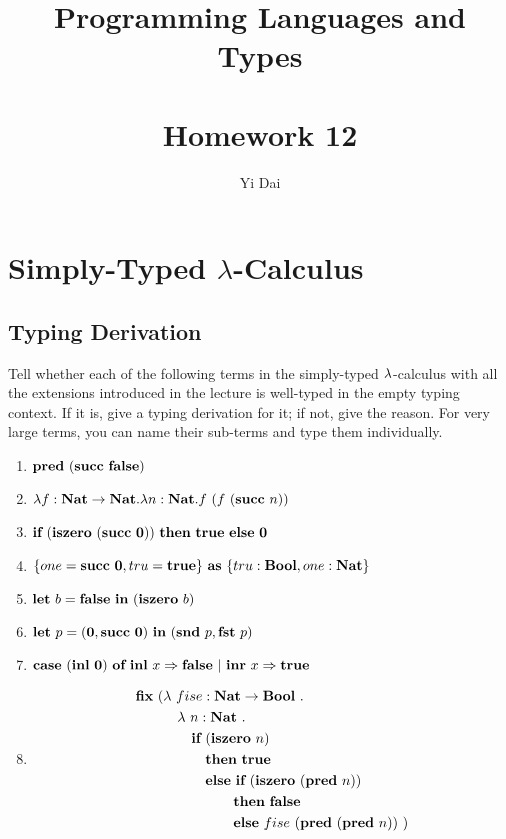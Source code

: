 \documentclass[a4paper,12pt]{article}
\title{
 Programming Languages and Types \\~\\
 \textbf{Homework 12}
}
\author{
 Yi Dai
}
\begin{document}
\maketitle

\section{Simply-Typed $\lambda$-Calculus}

\subsection{Typing Derivation}

Tell whether each of the following terms in the simply-typed $\lambda$-calculus with all the extensions 
introduced in the lecture is well-typed in the empty typing context.  If it is, give a typing derivation
for it; if not, give the reason.  For very large terms, you can name their sub-terms and type them
individually.

\begin{enumerate}
 \item $\textbf{pred}\ (\textbf{succ}\ \textbf{false})$
 \item $\lambda f : \textbf{Nat} \rightarrow \textbf{Nat} . \lambda n : \textbf{Nat} . f\ (f\ (\textbf{succ}\ n))$
 \item $\ifkw\ (\isze\ (\succ\ \zero))\ \thkw\ \true\ \elkw\ \zero$
 \item $\{one = \succ\ \zero, tru = \true\}\ \askw\ \{tru : \BlnT, one : \NatT\}$
 \item $\letk\ b = \fals\ \inkw\ (\isze\ b)$
 \item $\letk\ p = (\zero, \succ\ \zero)\ \inkw\ (\sndp\ p, \fstp\ p)$
 \item $\textbf{case}\ (\textbf{inl}\ \textbf{0})\ \textbf{of}\ \textbf{inl}\ x \Rightarrow \textbf{false}\ |\ \textbf{inr}\ x \Rightarrow \textbf{true}$
 \item
  \begin{align*}
   \fixp\ (& \lamb\ fise : \NatT \rarr \BlnT\ . \\
           & \quad \lamb\ n : \NatT\ . \\
           & \quad \quad \ifkw\ (\isze\ n) \\
           & \quad \quad \quad \thkw\ \true \\
           & \quad \quad \quad \elkw\ \ifkw\ (\isze\ (\pred\ n)) \\
           & \quad \quad \quad \quad \quad \thkw\ \fals \\
           & \quad \quad \quad \quad \quad \elkw\ fise\ (\pred\ (\pred\ n))\ )
  \end{align*}
\end{enumerate}
\end{document}
